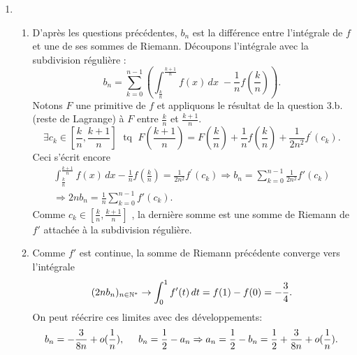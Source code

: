 \begin{enumerate}
\item  
\begin{enumerate}
 \item D'apr{\`e}s les questions pr{\'e}c{\'e}dentes, $b_{n}$ est la diff{\'e}rence entre l'int{\'e}grale de $f$ et une de ses sommes de Riemann. Découpons l'intégrale avec la subdivision r{\'e}guli{\`e}re :
\[
b_{n} = \sum_{k = 0}^{n - 1}\left( \int_{\frac{k}{n}}^{\frac{k + 1}{n}}f(x)\,dx\; - \frac{1}{n}f(\frac{k}{n})\right).
\]
Notons $F$ une primitive de $f$ et appliquons le résultat de la question 3.b. (reste de Lagrange) {\`a} $F$ entre $\frac{k}{n}$ et $\frac{k + 1}{n}$.
\[
\exists c_{k}\in \left[ \frac{k}{n},\frac{k + 1}{n}\right]\;\text{ tq }\; 
F(\frac{k + 1}{n}) = F(\frac{k}{n}) + \frac{1}{n}f(\frac{k}{n}) + \frac{1}{2n^{2}}f^{\prime }(c_{k}).
\]
Ceci s'{\'e}crit encore
\begin{multline*}
\int_{\frac{k}{n}}^{\frac{k + 1}{n}}f(x)\,dx - \frac{1}{n}f(\frac{k}{n}) 
= \frac{1}{2n^{2}}f^{\prime }(c_{k})
\Rightarrow b_n = \sum_{k = 0}^{n - 1} \frac{1}{2n^2}f'(c_{k}) \\
\Rightarrow 2nb_n  = \frac{1}{n} \sum_{k = 0}^{n - 1} f'(c_{k}).
\end{multline*}
Comme $c_k \in \left[ \frac{k}{n}, \frac{k + 1}{n}\right]$ , la dernière somme est une somme de Riemann de $f'$ attachée à la subdivision régulière. 

 \item Comme $f'$ est continue, la somme de Riemann précédente converge vers l'intégrale
\[
(2nb_{n})_{n\in \mathbb{N}^*} \rightarrow \int_{0}^{1}f'(t)\,dt = f(1)-f(0) = -\frac{3}{4}.
\] 
On peut réécrire ces limites avec des développements:
\[
 b_n = -\frac{3}{8n} + o(\frac{1}{n}), \hspace{0.5cm} b_n = \frac{1}{2} - a_n
 \Rightarrow a_n = \frac{1}{2} - b_n = \frac{1}{2} + \frac{3}{8n} + o(\frac{1}{n}).
\]

\end{enumerate}


\end{enumerate}